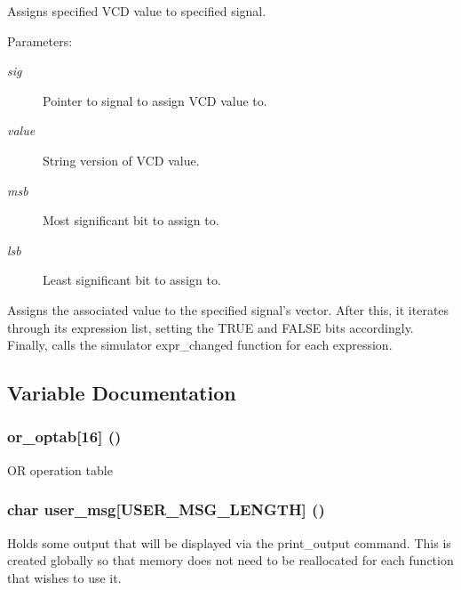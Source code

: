 Assigns specified VCD value to specified signal.

\begin{Desc}
\item[Parameters:]
\begin{description}
\item[{\em sig}]Pointer to signal to assign VCD value to. \item[{\em value}]String version of VCD value. \item[{\em msb}]Most significant bit to assign to. \item[{\em lsb}]Least significant bit to assign to.\end{description}
\end{Desc}
Assigns the associated value to the specified signal's vector. After this, it iterates through its expression list, setting the TRUE and FALSE bits accordingly. Finally, calls the simulator expr\_\-changed function for each expression. 

\subsection{Variable Documentation}
\subsubsection{ or\_\-optab[16] ()}\label{signal_8c_a0}


OR operation table 
\subsubsection{\setlength{\rightskip}{0pt plus 5cm}char user\_\-msg[USER\_\-MSG\_\-LENGTH] ()}\label{signal_8c_a1}


Holds some output that will be displayed via the print\_\-output command. This is created globally so that memory does not need to be reallocated for each function that wishes to use it. 